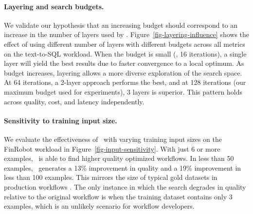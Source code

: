 \paragraph{Layering and search budgets.}

We validate our hypothesis that an increasing budget should correspond to an increase in the number of layers used by \sysname. Figure~\ref{fig-layering-influence} shows the effect of using different number of layers with different budgets across all metrics on the text-to-SQL workload. When the budget is small (\ie, 16 iterations), a single layer will yield the best results due to faster convergence to a local optimum. As budget increases, layering allows a more diverse exploration of the search space. At 64 iterations, a 2-layer approach performs the best, and at 128 iterations (our maximum budget used for experiments), 3 layers is superior. This pattern holds across quality, cost, and latency independently.

\paragraph{Sensitivity to training input size.}
We evaluate the effectiveness of \search\ with varying training input sizes on the FinRobot workload in Figure~\ref{fig-input-sensitivity}. With just 6 or more examples, \search\ is able to find higher quality optimized workflows. In less than 50 examples, \search\ generates a 13\% improvement in quality and a 19\% improvement in less than 100 examples. This mirrors the size of typical gold datasets in production workflows \cite{kulkarni25gold}. The only instance in which the search degrades in quality relative to the original workflow is when the training dataset contains only 3 examples, which is an unlikely scenario for workflow developers.



